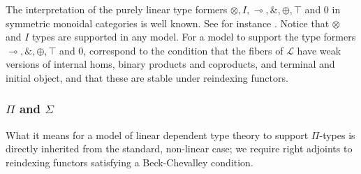\documentclass[a4paper,english]{lipics-v2018}
\begin{document}
The interpretation of the purely linear type formers $\otimes, I, \multimap, \&, \oplus, \top$ and $0$ in symmetric monoidal categories is well known. See for instance \cite{mellies}. Notice that $\otimes$ and $I$ types are supported in any model. For a model to support the type formers $\multimap, \&, \oplus, \top$ and $0$, correspond to the condition that the fibers of $\mathcal{L}$ have weak versions of internal homs, binary products and coproducts, and terminal and initial object, and that these are stable under reindexing functors.
\subsubsection{$\Pi$ and $\Sigma$}
What it means for a model of linear dependent type theory to support $\Pi$-types is directly inherited from the standard, non-linear case; we require right adjoints to reindexing functors satisfying a Beck-Chevalley condition.
\end{document}
